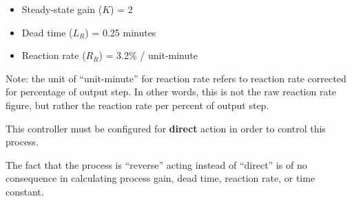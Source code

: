 \begin{itemize}
\item{}Steady-state gain ($K$) = 2
\vskip 5pt
\item{}Dead time ($L_R$) = 0.25 minutes
\vskip 5pt
\item{}Reaction rate ($R_R$) = 3.2\% / unit-minute
\end{itemize} 

\vskip 10pt

Note: the unit of ``unit-minute'' for reaction rate refers to reaction rate corrected for percentage of output step.  In other words, this is not the raw reaction rate figure, but rather the reaction rate per percent of output step.

\vskip 10pt

This controller must be configured for {\bf direct} action in order to control this process.







The fact that the process is ``reverse'' acting instead of ``direct'' is of no consequence in calculating process gain, dead time, reaction rate, or time constant.




